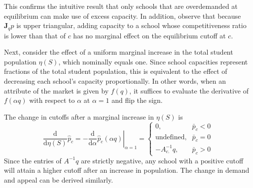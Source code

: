 \documentclass[12pt]{article}
\theoremstyle{definition}
\begin{document}
This confirms the intuitive result that only schools that are overdemanded at equilibrium can make use of excess capacity. In addition, observe that because $\mathbf{J}_q \hat p$ is upper triangular, adding capacity to a school whose competitiveness ratio is lower than that of $c$ has no marginal effect on the equilibrium cutoff at $c$. 

Next, consider the effect of a uniform marginal increase in the total student population $\eta(S)$, which nominally equals one. Since school capacities represent fractions of the total student population, this is equivalent to the effect of decreasing each school's capacity proportionally. In other words, when an attribute of the market is given by $f(q)$, it suffices to evaluate the derivative of $f(\alpha q)$ with respect to $\alpha$ at $\alpha =1$ and flip the sign.

The change in cutoffs after a marginal increase in $\eta(S)$ is
\begin{equation}\label{d-population-p}
\frac{\mathrm{d}}{\mathrm{d}\eta(S)} \hat p_c = 
- \left.\frac{\mathrm{d}}{\mathrm{d}\alpha} \hat p_c(\alpha q)\right|_{\alpha=1} = \begin{cases}
0, & \bar p_c < 0 \\
\text{undefined}, & \bar p_c = 0 \\
-A^{-1}_{c .} q, & \bar p_c > 0
\end{cases}
\end{equation}
Since the entries of $A^{-1}q$ are strictly negative, any school with a positive cutoff will attain a higher cutoff after an increase in population. The change in demand and appeal can be derived similarly. 


\end{document}
